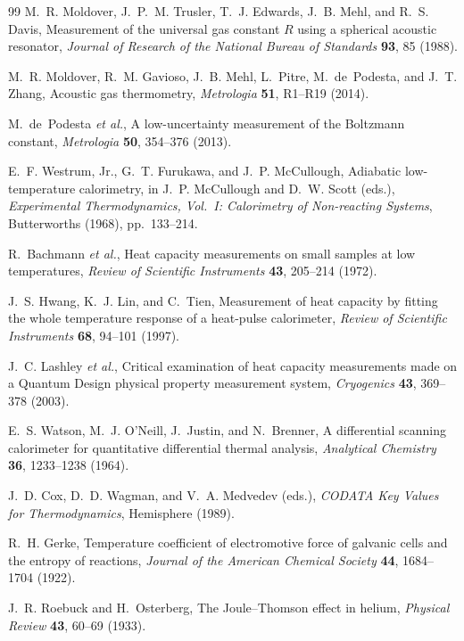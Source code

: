 \begin{thebibliography}{99}
M.~R. Moldover, J.~P.~M. Trusler, T.~J. Edwards, J.~B. Mehl, and R.~S. Davis,
Measurement of the universal gas constant $R$ using a spherical acoustic resonator,
\emph{Journal of Research of the National Bureau of Standards} \textbf{93}, 85 (1988).

M.~R. Moldover, R.~M. Gavioso, J.~B. Mehl, L.~Pitre, M.~de~Podesta, and J.~T. Zhang,
Acoustic gas thermometry,
\emph{Metrologia} \textbf{51}, R1--R19 (2014).

M.~de~Podesta \emph{et al.},
A low-uncertainty measurement of the Boltzmann constant,
\emph{Metrologia} \textbf{50}, 354--376 (2013).

E.~F. Westrum, Jr., G.~T. Furukawa, and J.~P. McCullough,
Adiabatic low-temperature calorimetry,
in J.~P. McCullough and D.~W. Scott (eds.), \emph{Experimental Thermodynamics, Vol.~I: Calorimetry of Non-reacting Systems},
Butterworths (1968), pp.~133--214.

R.~Bachmann \emph{et al.},
Heat capacity measurements on small samples at low temperatures,
\emph{Review of Scientific Instruments} \textbf{43}, 205--214 (1972).

J.~S. Hwang, K.~J. Lin, and C.~Tien,
Measurement of heat capacity by fitting the whole temperature response of a heat-pulse calorimeter,
\emph{Review of Scientific Instruments} \textbf{68}, 94--101 (1997).

J.~C. Lashley \emph{et al.},
Critical examination of heat capacity measurements made on a Quantum Design physical property measurement system,
\emph{Cryogenics} \textbf{43}, 369--378 (2003).

E.~S. Watson, M.~J. O'Neill, J.~Justin, and N.~Brenner,
A differential scanning calorimeter for quantitative differential thermal analysis,
\emph{Analytical Chemistry} \textbf{36}, 1233--1238 (1964).

J.~D. Cox, D.~D. Wagman, and V.~A. Medvedev (eds.),
\emph{CODATA Key Values for Thermodynamics},
Hemisphere (1989).

R.~H. Gerke,
Temperature coefficient of electromotive force of galvanic cells and the entropy of reactions,
\emph{Journal of the American Chemical Society} \textbf{44}, 1684--1704 (1922).

J.~R. Roebuck and H.~Osterberg,
The Joule--Thomson effect in helium,
\emph{Physical Review} \textbf{43}, 60--69 (1933).


\end{thebibliography}
